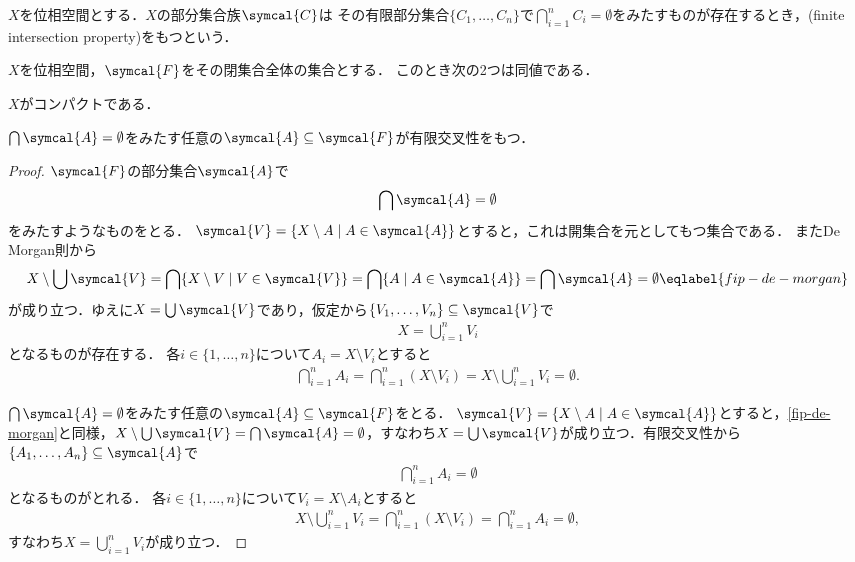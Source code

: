 \documentclass{ltjsbook}
\begin{document}
\(X\)を位相空間とする．\(X\)の部分集合族\(\symcal{C}\)は
その有限部分集合\(\{C_1, \ldots, C_n\}\)で\(\bigcap_{i = 1}^n C_i  = \emptyset\)をみたすものが存在するとき，(finite intersection property)をもつという．

\begin{thmbox}
\begin{proposition}
\(X\)を位相空間，\(\symcal{F}\)をその閉集合全体の集合とする．
このとき次の2つは同値である．
\begin{conditions}
    \item\label{fip-compact} \(X\)がコンパクトである．
    \item\label{fip-fip} \(\bigcap \symcal{A} = \emptyset\)をみたす任意の\(\symcal{A} \subseteq \symcal{F}\)が有限交叉性をもつ．
\end{conditions}
\end{proposition}
\end{thmbox}

\begin{proof} \(\symcal{F}\)の部分集合\(\symcal{A}\)で
\begin{align*}
    \bigcap \symcal{A} = \emptyset
\end{align*}
をみたすようなものをとる．
\(\symcal{V} = \{ X \setminus A \mid A \in \symcal{A}\}\)とすると，これは開集合を元としてもつ集合である．
またDe Morgan則から
\begin{align}
    X \setminus \bigcup \symcal{V}
    = \bigcap \{X \setminus V \mid V \in \symcal{V}\}
    = \bigcap \{A \mid A \in \symcal{A}\}
    = \bigcap \symcal{A}
    = \emptyset \eqlabel{fip-de-morgan}
\end{align}
が成り立つ．ゆえに\(X = \bigcup \symcal{V}\)であり，仮定から\(\{V_1, \ldots, V_n\} \subseteq \symcal{V}\)で
\begin{align*}
    X = \bigcup_{i = 1}^n V_i
\end{align*}
となるものが存在する．
各\(i \in \{1, \ldots, n\}\)について\(A_i = X \setminus V_i\)とすると
\begin{align*}
    \bigcap_{i = 1}^n A_i
    = \bigcap_{i = 1}^n (X \setminus V_i)
    = X \setminus \bigcup_{i = 1}^n V_i
    = \emptyset.
\end{align*}

\(\bigcap \symcal{A} = \emptyset\)をみたす任意の\(\symcal{A} \subseteq \symcal{F}\)をとる．
\(\symcal{V} = \{X \setminus A \mid A \in \symcal{A}\}\)とすると，\eqref{fip-de-morgan}と同様，\(X \setminus \bigcup \symcal{V} = \bigcap \symcal{A} = \emptyset\)，すなわち\(X = \bigcup \symcal{V}\)が成り立つ．有限交叉性から\(\{A_1, \ldots, A_n\} \subseteq \symcal{A}\)で
\begin{align*}
    \bigcap_{i = 1}^n A_i = \emptyset
\end{align*}
となるものがとれる．
各\(i \in \{1, \ldots, n\}\)について\(V_i = X \setminus A_i\)とすると
\begin{align*}
    X \setminus \bigcup_{i = 1}^n V_i
    = \bigcap_{i = 1}^n (X \setminus V_i)
    = \bigcap_{i = 1}^n A_i
    = \emptyset, %
\end{align*}
すなわち\(X = \bigcup_{i = 1}^n V_i\)が成り立つ．
\end{proof}
\end{document}
